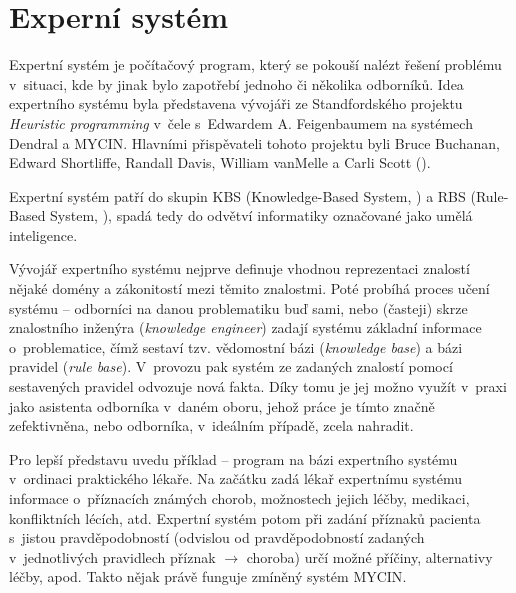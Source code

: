 \section{Experní systém}
Expertní systém je počítačový program, který se pokouší nalézt řešení problému
v~situaci, kde by jinak bylo zapotřebí jednoho či několika odborníků.
Idea expertního systému byla představena vývojáři ze Standfordského projektu
\emph{Heuristic programming} v~čele s~Edwardem A. Feigenbaumem na systémech
\textsf{Dendral} a \textsf{MYCIN}. Hlavními přispěvateli tohoto projektu byli
Bruce Buchanan, Edward Shortliffe, Randall Davis, William vanMelle a Carli
Scott (\cite{expert-system}).

Expertní systém patří do skupin KBS (Knowledge-Based System, ) a RBS (Rule-Based System, ), spadá tedy do odvětví informatiky označované jako umělá
inteligence.

Vývojář expertního systému nejprve definuje vhodnou reprezentaci znalostí nějaké
domény a zákonitostí mezi těmito znalostmi. Poté probíhá proces učení systému --
odborníci na danou problematiku buď sami, nebo (časteji) skrze znalostního
inženýra (\emph{knowledge engineer}) zadají systému základní informace
o~problematice, čímž sestaví tzv. vědomostní bázi (\emph{knowledge base})
a bázi pravidel (\emph{rule base}). V~provozu pak systém ze zadaných znalostí
pomocí sestavených pravidel odvozuje nová fakta. Díky tomu je jej možno využít
v~praxi jako asistenta odborníka v~daném oboru, jehož práce je tímto značně
zefektivněna, nebo odborníka, v~ideálním případě, zcela nahradit.

Pro lepší představu uvedu příklad -- program na bázi expertního systému
v~ordinaci praktického lékaře. Na začátku zadá lékař expertnímu systému
informace o~příznacích známých chorob, možnostech jejich léčby, medikaci,
konfliktních lécích, atd. Expertní systém potom při zadání příznaků pacienta
s~jistou pravděpodobností (odvislou od pravděpodobností zadaných v~jednotlivých
pravidlech příznak $\rightarrow$ choroba) určí možné příčiny, alternativy léčby,
apod. Takto nějak právě funguje zmíněný systém \textsf{MYCIN}.
